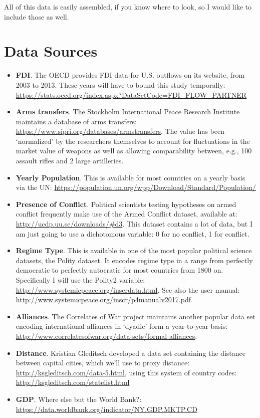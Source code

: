 \documentclass[12pt,]{article}
\begin{document}
All of this data is easily assembled, if you know where to look, so I
would like to include those as well.

\hypertarget{data-sources}{%
\section{Data Sources}\label{data-sources}}

\begin{itemize}
\item
  \textbf{FDI}. The OECD provides FDI data for U.S. outflows on its
  website, from 2003 to 2013. These years will have to bound this study
  temporally:
  \url{https://stats.oecd.org/index.aspx?DataSetCode=FDI_FLOW_PARTNER}
\item
  \textbf{Arms transfers}. The Stockholm International Peace Research
  Institute maintains a database of arms transfers:
  \url{https://www.sipri.org/databases/armstransfers}. The value has
  been `normalized' by the researchers themselves to account for
  fluctuations in the market value of weapons as well as allowing
  comparability between, e.g., 100 assault rifles and 2 large
  artilleries.
\item
  \textbf{Yearly Population}. This is available for most countries on a
  yearly basis via the UN:
  \url{https://population.un.org/wpp/Download/Standard/Population/}
\item
  \textbf{Presence of Conflict}. Political scientists testing hypotheses
  on armed conflict frequently make use of the Armed Conflict dataset,
  available at: \url{http://ucdp.uu.se/downloads/\#d3}. This dataset
  contains a lot of data, but I am just going to use a dichotomous
  variable: 0 for no conflict, 1 for conflict.
\item
  \textbf{Regime Type}. This is available in one of the most popular
  political science datasets, the Polity dataset. It encodes regime type
  in a range from perfectly democratic to perfectly autocratic for most
  countries from 1800 on. Specifically I will use the Polity2 variable:
  \url{http://www.systemicpeace.org/inscrdata.html}. See also the user
  manual: \url{http://www.systemicpeace.org/inscr/p4manualv2017.pdf}.
\item
  \textbf{Alliances}. The Correlates of War project maintains another
  popular data set encoding international alliances in `dyadic' form a
  year-to-year basis:
  \url{http://www.correlatesofwar.org/data-sets/formal-alliances}.
\item
  \textbf{Distance}. Kristian Gleditsch developed a data set containing
  the distance between capital cities, which we'll use to proxy
  distance: \url{http://ksgleditsch.com/data-5.html}, using this system
  of country codes: \url{http://ksgleditsch.com/statelist.html}
\item
  \textbf{GDP}. Where else but the World Bank?:
  \url{https://data.worldbank.org/indicator/NY.GDP.MKTP.CD}
\end{itemize}
\end{document}
